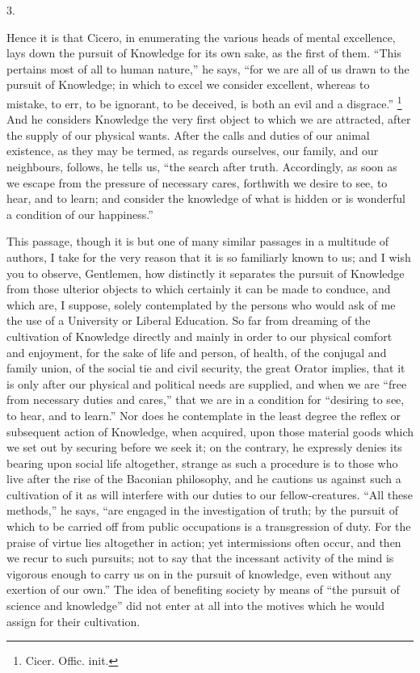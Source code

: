 3.

Hence it is that Cicero, in enumerating the various heads of mental
excellence, lays down the pursuit of Knowledge for its own sake, as
the first of them. ``This pertains most of all to human
nature,'' he says, ``for we are all of us drawn to the pursuit
of Knowledge; in which to excel we consider excellent, whereas to
mistake, to err, to be ignorant, to be deceived, is both an evil and a
disgrace.'' \footnote{Cicer. Offic.
init.} And he considers Knowledge the very first object to which we
are attracted, after the supply of our physical wants. After the calls
and duties of our animal existence, as they may be termed, as regards
ourselves, our family, and our neighbours, follows, he tells us,
``the search after truth. Accordingly, as soon as we escape from
the pressure of necessary cares, forthwith we desire to see, to hear,
and to learn; and consider the knowledge of what is hidden or is
wonderful a condition of our happiness.''

This passage, though it is but one of many similar passages in a
multitude of authors, I take for the very reason that it is so
familiarly known to us; and I wish you to observe, Gentlemen, how
distinctly it separates the pursuit of Knowledge from those ulterior
objects to which certainly it can be made to conduce, and which are, I
suppose, solely contemplated by the persons who would ask of me the
use of a University or Liberal Education. So far from dreaming of the
cultivation of Knowledge directly and mainly in order to our physical
comfort and enjoyment, for the sake of life and person, of health, of
the conjugal and family union, of the social tie and civil security,
the great Orator implies, that it is only after our physical and
political needs are supplied, and when we are ``free from
necessary duties and cares,'' that we are in a condition for
``desiring to see, to hear, and to learn.'' Nor does he
contemplate in the least degree the reflex or subsequent action of
Knowledge, when acquired, upon those material goods which we set out
by securing before we seek it; on the contrary, he expressly denies
its bearing upon social life altogether, strange as such a procedure
is to those who live after the rise of the Baconian philosophy, and he
cautions us against such a cultivation of it as will interfere with
our duties to our fellow-creatures. ``All these methods,'' he
says, ``are engaged in the investigation of truth; by the pursuit
of which to be carried off from public occupations is a transgression
of duty. For the praise of virtue lies altogether in action; yet
intermissions often occur, and then we recur to such pursuits; not to
say that the incessant activity of the mind is vigorous enough to
carry us on in the pursuit of knowledge, even without any exertion of
our own.'' The idea of benefiting society by means of ``the
pursuit of science and knowledge'' did not enter at all into
the motives which he would assign for their cultivation.

